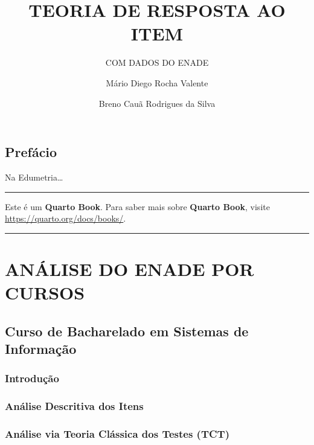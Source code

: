 \documentclass[
  portuguese,
  11pt,
  a4paper,
  DIV=11,
  numbers=noendperiod]{scrreprt}
\title{TEORIA DE RESPOSTA AO ITEM}
\subtitle{COM DADOS DO ENADE}
\author{Mário Diego Rocha Valente \and Breno Cauã Rodrigues da Silva}
\date{}
\renewcommand*\contentsname{Índice}
\newcommand\contentsname{Índice}
\begin{document}
\maketitle

\renewcommand*\contentsname{Índice}
{
\hypersetup{linkcolor=}
\setcounter{tocdepth}{2}
\tableofcontents
}


\chapter*{Prefácio}\label{prefuxe1cio}


Na Edumetria\ldots{}

\begin{center}\rule{0.5\linewidth}{0.5pt}\end{center}

Este é um \textbf{Quarto Book}. Para saber mais sobre \textbf{Quarto
Book}, visite \url{https://quarto.org/docs/books/}.

\begin{center}\rule{0.5\linewidth}{0.5pt}\end{center}

\part{ANÁLISE DO ENADE POR CURSOS}


\chapter{Curso de Bacharelado em Sistemas de
Informação}\label{curso-de-bacharelado-em-sistemas-de-informauxe7uxe3o}

\section{Introdução}\label{introduuxe7uxe3o}

\section{Análise Descritiva dos
Itens}\label{anuxe1lise-descritiva-dos-itens}

\section{Análise via Teoria Clássica dos Testes
(TCT)}\label{anuxe1lise-via-teoria-cluxe1ssica-dos-testes-tct}
\end{document}
